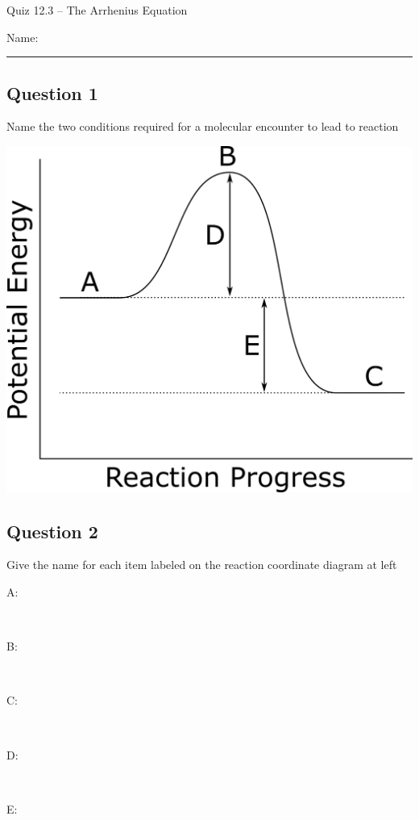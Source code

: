 \documentclass[11pt, letterpaper]{memoir}
\begin{document}
	\begin{center}
		{\large	Quiz 12.3 -- The Arrhenius Equation}
	\end{center}
	{\large Name: \rule[-1mm]{4in}{.1pt} 
	
	\noindent
	
	\subsection*{Question 1}
	Name the two conditions required for a molecular encounter to lead to reaction
	
	\vspace{3em}
	\begin{minipage}{0.4\linewidth}
		\noindent \hspace{-2em} \includegraphics[width=1.1\linewidth]{Simple_Rx_Coordinate} 
	\end{minipage}\hspace{1em}
	\begin{minipage}{0.49\linewidth}
		\subsection*{Question 2}
		Give the name for each item labeled on the reaction coordinate diagram at left
		\begin{description}
			\item[A:] ~
			\item[B:] ~
			\item[C:] ~
			\item[D:] ~
			\item[E:] ~
		\end{description}
	\end{minipage}
	
}
\end{document}
